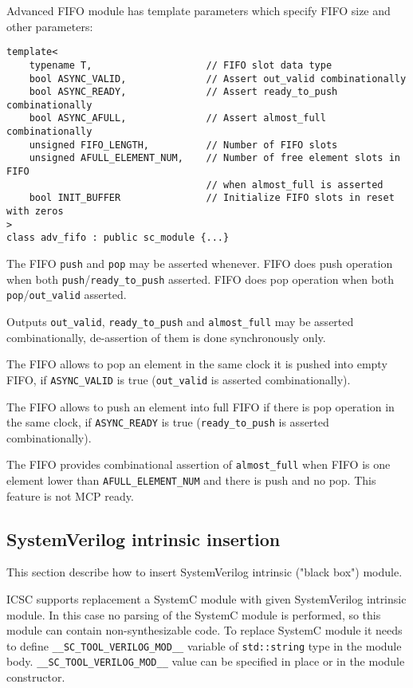 Advanced FIFO module has template parameters which specify FIFO size and other parameters:  
%
\begin{lstlisting}[style=mycpp]
template<
    typename T,                    // FIFO slot data type 
    bool ASYNC_VALID,              // Assert out_valid combinationally
    bool ASYNC_READY,              // Assert ready_to_push combinationally
    bool ASYNC_AFULL,              // Assert almost_full combinationally
    unsigned FIFO_LENGTH,          // Number of FIFO slots
    unsigned AFULL_ELEMENT_NUM,    // Number of free element slots in FIFO
                                   // when almost_full is asserted
    bool INIT_BUFFER               // Initialize FIFO slots in reset with zeros
>
class adv_fifo : public sc_module {...}
\end{lstlisting}

The FIFO {\tt push} and {\tt pop} may be asserted whenever. FIFO does push operation when both {\tt push}/{\tt ready\_to\_push} asserted. FIFO does pop operation when both {\tt pop}/{\tt out\_valid} asserted.
 
Outputs {\tt out\_valid}, {\tt ready\_to\_push} and {\tt almost\_full} may be asserted combinationally, de-assertion of them is done synchronously only. 

The FIFO allows to pop an element in the same clock it is pushed into empty FIFO, if {\tt ASYNC\_VALID} is true ({\tt out\_valid} is asserted combinationally).

The FIFO allows to push an element into full FIFO if there is pop operation in the same clock, if {\tt ASYNC\_READY} is true ({\tt ready\_to\_push} is asserted combinationally).

The FIFO provides combinational assertion of {\tt almost\_full} when FIFO is one element lower than {\tt AFULL\_ELEMENT\_NUM} and there is push and no pop. This feature is not MCP ready.


\subsection{SystemVerilog intrinsic insertion}\label{section:black_box}

This section describe how to insert SystemVerilog intrinsic ("black box") module.

ICSC supports replacement a SystemC module with given SystemVerilog intrinsic module. In this case no parsing of the SystemC module is performed, so this module can contain non-synthesizable code. To replace SystemC module it needs to define {\tt \_\_SC\_TOOL\_VERILOG\_MOD\_\_} variable of {\tt std::string} type in the module body.
{\tt \_\_SC\_TOOL\_VERILOG\_MOD\_\_} value can be specified in place or in the module constructor.

